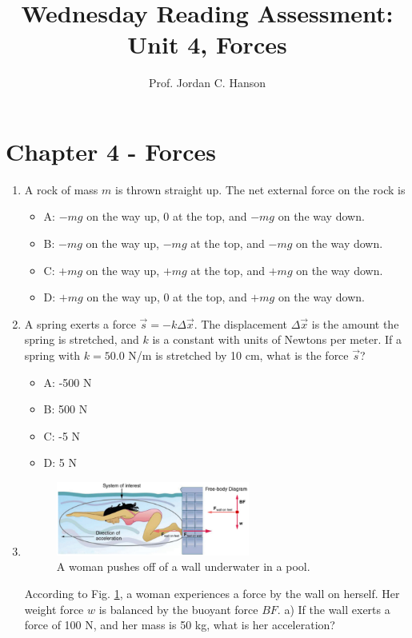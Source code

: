 \documentclass{article}
\begin{document}
\title{Wednesday Reading Assessment: Unit 4, Forces}
\author{Prof. Jordan C. Hanson}

\maketitle

\section{Chapter 4 - Forces}

\begin{enumerate}
\item A rock of mass $m$ is thrown straight up. The net external force on the rock is
\begin{itemize}
\item A: $-mg$ on the way up, 0 at the top, and $-mg$ on the way down.
\item B: $-mg$ on the way up, $-mg$ at the top, and $-mg$ on the way down.
\item C: $+mg$ on the way up, $+mg$ at the top, and $+mg$ on the way down.
\item D: $+mg$ on the way up, 0 at the top, and $+mg$ on the way down.
\end{itemize}
\item A spring exerts a force $\vec{s} = -k \Delta\vec{x}$.  The displacement $\Delta\vec{x}$ is the amount the spring is stretched, and $k$ is a constant with units of Newtons per meter.  If a spring with $k = 50.0$ N/m is stretched by 10 cm, what is the force $\vec{s}$?
\begin{itemize}
\item A: -500 N
\item B: 500 N
\item C: -5 N
\item D: 5 N
\end{itemize}
\item 
\begin{figure}[ht]
\centering
\includegraphics[width=0.6\textwidth]{wall.png}
\caption{\label{fig:wall} A woman pushes off of a wall underwater in a pool.}
\end{figure}
According to Fig. \ref{fig:wall}, a woman experiences a force by the wall on herself.  Her weight force $w$ is balanced by the buoyant force $BF$.  a) If the wall exerts a force of 100 N, and her mass is 50 kg, what is her acceleration?
\end{enumerate}
\end{document}
